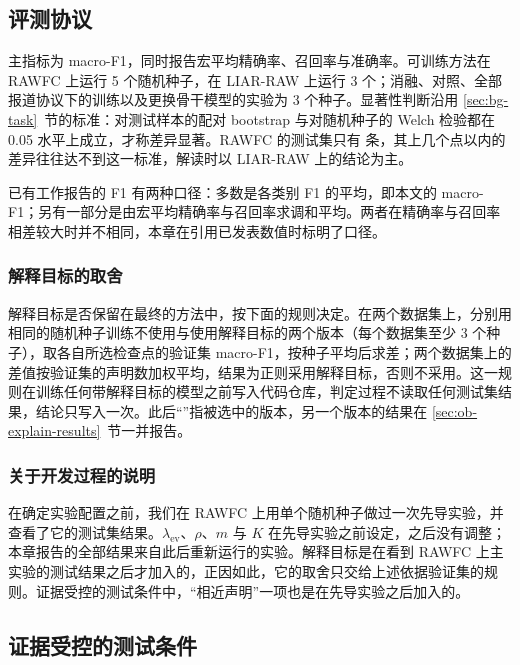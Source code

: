 \subsection{评测协议}

主指标为 macro-F1，同时报告宏平均精确率、召回率与准确率。可训练方法在 RAWFC 上运行 5 个随机种子，在 LIAR-RAW 上运行 3 个；消融、对照、全部报道协议下的训练以及更换骨干模型的实验为 3 个种子。显著性判断沿用 \ref{sec:bg-task}~节的标准：对测试样本的配对 bootstrap 与对随机种子的 Welch 检验都在 0.05 水平上成立，才称差异显著。RAWFC 的测试集只有  条，其上几个点以内的差异往往达不到这一标准，解读时以 LIAR-RAW 上的结论为主。

已有工作报告的 F1 有两种口径：多数是各类别 F1 的平均，即本文的 macro-F1；另有一部分是由宏平均精确率与召回率求调和平均。两者在精确率与召回率相差较大时并不相同，本章在引用已发表数值时标明了口径。

\subsubsection{解释目标的取舍}
解释目标是否保留在最终的方法中，按下面的规则决定。在两个数据集上，分别用相同的随机种子训练不使用与使用解释目标的两个版本（每个数据集至少 3 个种子），取各自所选检查点的验证集 macro-F1，按种子平均后求差；两个数据集上的差值按验证集的声明数加权平均，结果为正则采用解释目标，否则不采用。这一规则在训练任何带解释目标的模型之前写入代码仓库，判定过程不读取任何测试集结果，结论只写入一次。此后“\ours{}”指被选中的版本，另一个版本的结果在 \ref{sec:ob-explain-results}~节一并报告。

\subsubsection{关于开发过程的说明}
在确定实验配置之前，我们在 RAWFC 上用单个随机种子做过一次先导实验，并查看了它的测试集结果。$\lambda_{\mathrm{ev}}$、$\rho$、$m$ 与 $K$ 在先导实验之前设定，之后没有调整；本章报告的全部结果来自此后重新运行的实验。解释目标是在看到 RAWFC 上主实验的测试结果之后才加入的，正因如此，它的取舍只交给上述依据验证集的规则。证据受控的测试条件中，“相近声明”一项也是在先导实验之后加入的。

\subsection{证据受控的测试条件}\label{sec:ob-conditions}

